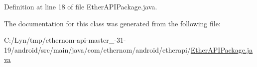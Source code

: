 Definition at line 18 of file Ether\+A\+P\+I\+Package.\+java.



The documentation for this class was generated from the following file\+:\begin{DoxyCompactItemize}
\item 
C\+:/\+Lyn/tmp/ethernom-\/api-\/master\+\_-\/31-\/19/android/src/main/java/com/ethernom/android/etherapi/\mbox{\hyperlink{_ether_a_p_i_package_8java}{Ether\+A\+P\+I\+Package.\+java}}\end{DoxyCompactItemize}
